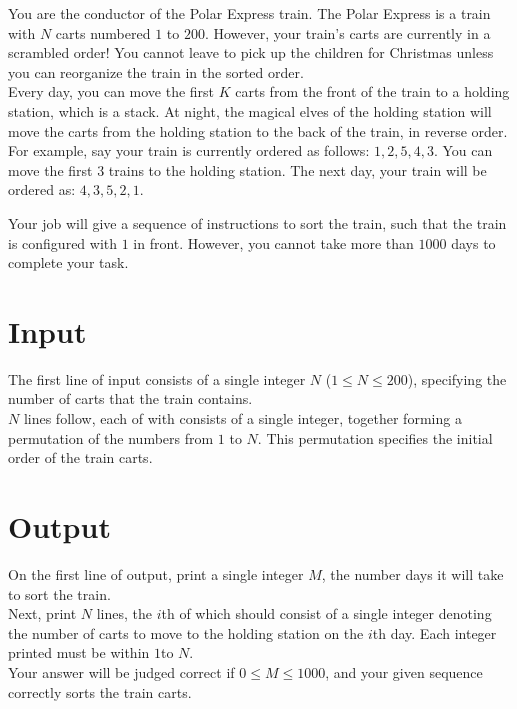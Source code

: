 
\noindent You are the conductor of the Polar Express train. The Polar Express is a train with $N$ carts numbered $1$ to $200$. However, your train's carts are currently in a scrambled order! You cannot leave to pick up the children for Christmas unless you can reorganize the train in the sorted order. \\

Every day, you can move the first $K$ carts from the front of the train to a holding station, which is a stack. At night, the magical elves of the holding station will move the carts from the holding station to the back of the train, in reverse order. \\

For example, say your train is currently ordered as follows: $1, 2, 5, 4, 3$. You can move the first 3 trains to the holding station. The next day, your train will be ordered as: $4, 3, 5, 2, 1$.

Your job will give a sequence of instructions to sort the train, such that the train is configured with $1$ in front. However, you cannot take more than $1000$ days to complete your task.\\

\section*{Input}
The first line of input consists of a single integer $N$ ($1 \leq N \leq 200$), specifying the number of carts that the train contains.\\
$N$ lines follow, each of with consists of a single integer, together forming a permutation of the numbers from $1$ to $N$. This permutation specifies the initial order of the train carts.\\

\section*{Output}
On the first line of output, print a single integer $M$, the number days it will take to sort the train.\\
Next, print $N$ lines, the $i$th of which should consist of a single integer denoting the number of carts to move to the holding station on the $i$th day. Each integer printed must be within $1$to $N$.\\
Your answer will be judged correct if $0 \leq M \leq 1000$, and your given sequence correctly sorts the train carts.
